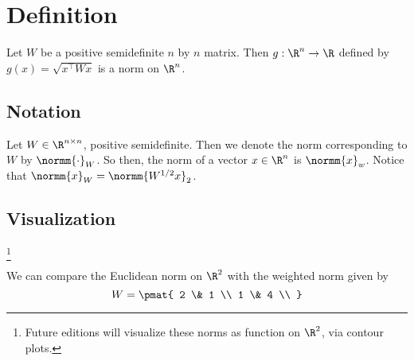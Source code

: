 
\section*{Definition}

\begin{proposition}Let $W$ be a positive semidefinite $n$ by $n$ matrix.
Then $g: \R ^n \to \R $ defined by $g(x) = \sqrt{x^\top  W x}$ is a norm on $\R ^n$.\end{proposition}
\subsection*{Notation}

Let $W \in \R ^{n \times n}$, positive semidefinite.
Then we denote the norm corresponding to $W$ by $\normm{\cdot }_{W}$.
So then, the norm of a vector $x \in \R ^n$ is $\normm{x}_{w}$.
Notice that $\normm{x}_{W} = \normm{W^{1/2}x}_2$.

\subsection*{Visualization}

\ifhmode\unskip\fi\footnote{
Future editions will visualize these norms as function on $\R ^2$, via contour plots.
}

We can compare the Euclidean norm on $\R ^2$ with the weighted norm given by
  \[
W = \pmat{
2 \& 1 \\
1 \& 4 \\
}
  \]


\blankpage